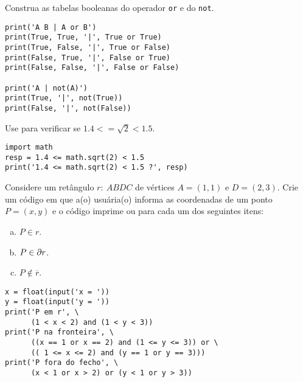 \begin{exer}
  Construa as tabelas booleanas do operador \texttt{or} e do \texttt{not}.
\end{exer}
\begin{resp}

\begin{lstlisting}
print('A B | A or B')
print(True, True, '|', True or True)
print(True, False, '|', True or False)
print(False, True, '|', False or True)
print(False, False, '|', False or False)

print('A | not(A)')
print(True, '|', not(True))
print(False, '|', not(False))
\end{lstlisting}

\end{resp}

\begin{exer}
  Use {\python} para verificar se $1.4 <= \sqrt{2} < 1.5$.
\end{exer}
\begin{resp}

\begin{lstlisting}
import math
resp = 1.4 <= math.sqrt(2) < 1.5
print('1.4 <= math.sqrt(2) < 1.5 ?', resp)
\end{lstlisting}

\end{resp}

\begin{exer}
  Considere um retângulo $r: ~ABDC$ de vértices $A = (1, 1)$ e $D = (2, 3)$. Crie um código em que a(o) usuária(o) informa as coordenadas de um ponto $P = (x, y)$ e o código imprime {\PYTHONTrue} ou {\PYTHONFalse} para cada um dos seguintes itens:
  \begin{enumerate}[a)]
  \item $P\in r$.
  \item $P\in \partial r$.
  \item $P\not\in \overline{r}$.
  \end{enumerate}
\end{exer}
\begin{resp}
  
\begin{lstlisting}
x = float(input('x = '))
y = float(input('y = '))
print('P em r', \
      (1 < x < 2) and (1 < y < 3))
print('P na fronteira', \
      ((x == 1 or x == 2) and (1 <= y <= 3)) or \
      (( 1 <= x <= 2) and (y == 1 or y == 3)))
print('P fora do fecho', \
      (x < 1 or x > 2) or (y < 1 or y > 3))
\end{lstlisting}

\end{resp}

